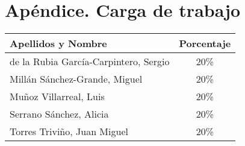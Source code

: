\documentclass[12pt,a4paper,spanish,twoside]{book}
\begin{document}
% 

% 

% 

% 

\chapter*{Apéndice. Carga de trabajo}
\begin{center}
  \begin{tabular}{p{10cm}|c}
    \textbf{Apellidos y Nombre} & \textbf{Porcentaje} \\ \hline \hline
    de la Rubia García-Carpintero, Sergio & 20\% \\ \hline
    Millán Sánchez-Grande, Miguel & 20\% \\ \hline
    Muñoz Villarreal, Luis & 20\% \\ \hline
    Serrano Sánchez, Alicia & 20\% \\ \hline
    Torres Triviño, Juan Miguel & 20\%
  \end{tabular}
\end{center}

 

\end{document}
